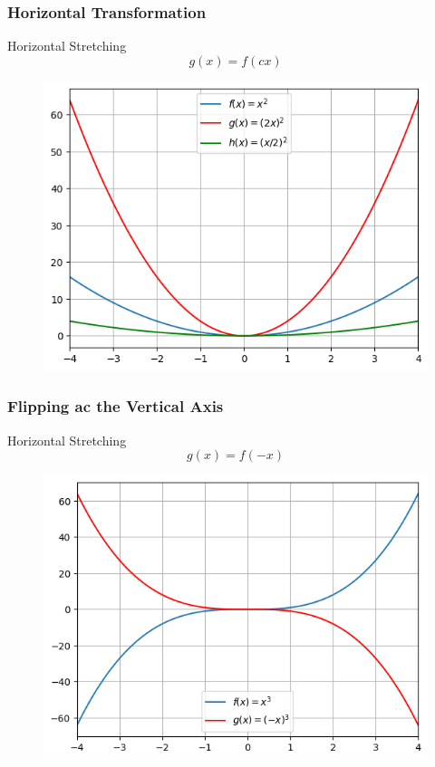 \documentclass{beamer}
\begin{document}
\begin{frame}
    \frametitle{Horizontal Transformation}
    \begin{block}{Horizontal Stretching}
      \[g(x) = f(cx)\]
    \end{block}
    \begin{figure}[h]    
      \centering
      \includegraphics[scale=0.55]{horizontal-stretch.png}
      \end{figure}
\end{frame}
\begin{frame}
  \frametitle{Flipping ac the Vertical Axis}
  \begin{block}{Horizontal Stretching}
    \[g(x) = f(-x)\]
  \end{block}
  \begin{figure}[h]    
    \centering
    \includegraphics[scale=0.55]{vertical-axis-flip.png}
    \end{figure}
\end{frame}
\end{document}
